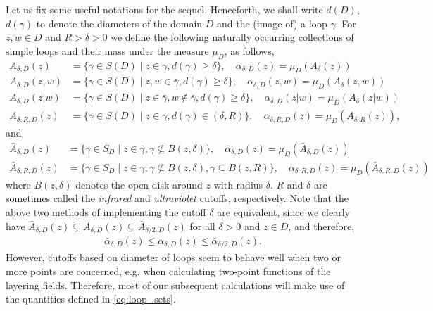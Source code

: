 \documentclass[a4paper, 11pt, reqno]{amsart}
\theoremstyle{definition} \newtheorem{defn}{Definition}[section]
\theoremstyle{remark} \newtheorem{rem}[defn]{Remark}
\theoremstyle{remark} \newtheorem*{rem*}{Remark}
\theoremstyle{plain} \newtheorem{thm}[defn]{Theorem}
\theoremstyle{plain} \newtheorem{lem}[defn]{Lemma}
\theoremstyle{plain} \newtheorem{prop}[defn]{Proposition}
\theoremstyle{plain} \newtheorem{cor}[defn]{Corollary}
\theoremstyle{remark} \newtheorem{exm}[defn]{\textbf{Example}}
\theoremstyle{remark} \newtheorem{exms}[defn]{\textbf{Examples}}
\theoremstyle{remark} \newtheorem*{bl}{}
\numberwithin{equation}{section} %
\begin{document}
    Let us fix some useful notations for the sequel. Henceforth, we shall write $d(D)$, $d(\gamma)$ to denote the diameters of the domain $D$ and the (image of) a loop $\gamma$. For $z, w \in D$ and $R> \delta>0$ we define the following naturally occurring collections of simple loops and their mass under the measure $\mu_D$, as follows, 
	\begin{align}\label{eq:loop_sets}
		A_{\delta, D}(z) & = \{\gamma \in S(D) \mid z\in \bar{\gamma}, d(\gamma) \ge \delta\}, \quad \alpha_{\delta, D}(z) = \mu_D(A_{\delta}(z)) 
		\nonumber \\
		A_{\delta, D}(z,w) & = \{\gamma \in S(D) \mid z,w\in \bar{\gamma}, d(\gamma) \ge \delta\}, \quad \alpha_{\delta, D}(z, w)= \mu_D(A_{\delta}(z, w)) 
		\nonumber \\
		A_{\delta, D}(z|w) & = \{\gamma \in S(D) \mid z\in \bar{\gamma}, w\notin \bar{\gamma}, d(\gamma) \ge \delta\}, \quad \alpha_{\delta, D}(z| w)= \mu_D(A_{\delta}(z| w))
		\nonumber \\
		A_{\delta, R, D}(z) & = \{\gamma \in S(D) \mid z\in \bar{\gamma},d(\gamma) \in (\delta, R)\}, \quad \alpha_{\delta, R, D}(z)= \mu_D(A_{\delta,R}(z)),
	\end{align}
    and 
    \begin{align}\label{eq:loop_sets_disk}
        \bar{A}_{\delta, D}(z) & = \{\gamma \in S_D \mid z\in \bar{\gamma}, \gamma \nsubseteq B(z, \delta) \}, \quad \bar{\alpha}_{\delta, D}(z) = \mu_D(\bar{A}_{\delta, D}(z)) 
        \nonumber \\
        \bar{A}_{\delta, R, D}(z) & = \{\gamma \in S_D \mid z\in \bar{\gamma},\gamma \nsubseteq B(z, \delta) , \gamma \subseteq B(z, R) \}, \quad \bar{\alpha}_{\delta, R, D}(z)= \mu_D(\bar{A}_{\delta,R, D}(z))
    \end{align}
    where $B(z, \delta)$ denotes the open disk around $z$ with radius $\delta$.  $R$ and $\delta$ are sometimes called the \textit{infrared} and \textit{ultraviolet} cutoffs, respectively. Note that the above two methods of implementing the cutoff $\delta$ are equivalent, since we clearly have $\bar{A}_{\delta, D}(z) \subsetneq A_{\delta, D}(z) \subsetneq \bar{A}_{\delta/2, D}(z)$
    for all $\delta>0$ and $z \in D$, and therefore, 
    \begin{align}\label{eq:diam_disk_rel_2}
            \bar{\alpha}_{\delta, D}(z) \le \alpha_{\delta, D}(z) \le \bar{\alpha}_{\delta/2, D}(z).
    \end{align}
    However, cutoffs based on diameter of loops seem to behave well when two or more points are concerned, e.g. when calculating two-point functions of the layering fields. Therefore, most of our subsequent calculations will make use of the quantities defined in \eqref{eq:loop_sets}.         
\end{document}
